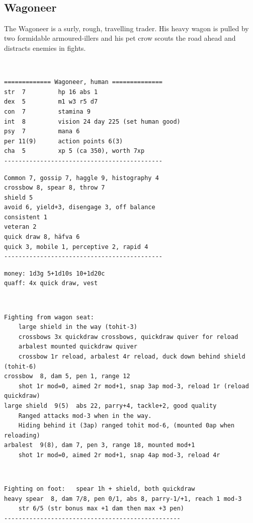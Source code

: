 \


\goodbreak 
\subsection*{Wagoneer}
\label{wagoneer}

The Wagoneer is a surly, rough, travelling trader. His heavy wagon is pulled by two formidable armoured-illers and his pet crow scouts the road ahead and distracts enemies in fights.

\

\small \begin{samepage} \begin{verbatim}
============= Wagoneer, human ==============
str  7         hp 16 abs 1
dex  5         m1 w3 r5 d7
con  7         stamina 9
int  8         vision 24 day 225 (set human good)
psy  7         mana 6
per 11(9)      action points 6(3)
cha  5         xp 5 (ca 350), worth 7xp
--------------------------------------------
\end{verbatim} \end{samepage} \goodbreak \begin{samepage} \begin{verbatim}
Common 7, gossip 7, haggle 9, histography 4
crossbow 8, spear 8, throw 7
shield 5
avoid 6, yield+3, disengage 3, off balance
consistent 1
veteran 2
quick draw 8, häfva 6
quick 3, mobile 1, perceptive 2, rapid 4
--------------------------------------------
\end{verbatim} \end{samepage} \goodbreak \begin{samepage} \begin{verbatim}
money: 1d3g 5+1d10s 10+1d20c
quaff: 4x quick draw, vest
\end{verbatim} \end{samepage}   \   \goodbreak \begin{samepage} \begin{verbatim}
Fighting from wagon seat:
    large shield in the way (tohit-3)
    crossbows 3x quickdraw crossbows, quickdraw quiver for reload
    arbalest mounted quickdraw quiver
    crossbow 1r reload, arbalest 4r reload, duck down behind shield (tohit-6)
crossbow  8, dam 5, pen 1, range 12
    shot 1r mod=0, aimed 2r mod+1, snap 3ap mod-3, reload 1r (reload quickdraw)
large shield  9(5)  abs 22, parry+4, tackle+2, good quality
    Ranged attacks mod-3 when in the way.
    Hiding behind it (3ap) ranged tohit mod-6, (mounted 0ap when reloading)
arbalest  9(8), dam 7, pen 3, range 18, mounted mod+1
    shot 1r mod=0, aimed 2r mod+1, snap 4ap mod-3, reload 4r
\end{verbatim} \end{samepage}   \   \goodbreak \begin{samepage} \begin{verbatim}
Fighting on foot:   spear 1h + shield, both quickdraw
heavy spear  8, dam 7/8, pen 0/1, abs 8, parry-1/+1, reach 1 mod-3
    str 6/5 (str bonus max +1 dam then max +3 pen)
-------------------------------------------------
\end{verbatim} \end{samepage} \normalsize

